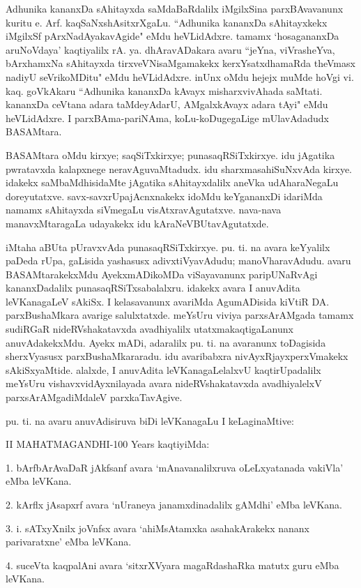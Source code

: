Adhunika kananxDa sAhitayxda saMdaBaRdalilx iMgilxSina parxBAvavanunx kuritu e. Arf. kaqSaNxshAsitxrXgaLu. ``Adhunika kananxDa sAhitayxkekx iMgilxSf pArxNadAyakavAgide" eMdu heVLidAdxre. tamamx `hosagananxDa aruNoVdaya' kaqtiyalilx rA. ya. dhAravADakara avaru ``jeYna, viVrasheYva, bArxhamxNa sAhitayxda tirxveVNisaMgamakekx kerxYsatxdhamaRda theVmasx nadiyU seVrikoMDitu" eMdu heVLidAdxre. inUnx oMdu hejejx muMde hoVgi vi. kaq. goVkAkaru ``Adhunika kananxDa kAvayx misharxvivAhada saMtati. kananxDa ceVtana adara taMdeyAdarU, AMgalxkAvayx adara tAyi" eMdu heVLidAdxre. I parxBAma-pariNAma, koLu-koDugegaLige mUlavAdadudx BASAMtara.  

BASAMtara oMdu kirxye; saqSiTxkirxye; punasaqRSiTxkirxye. idu jAgatika pwratavxda kalapxnege neravAguvaMtadudx. idu sharxmasahiSuNxvAda kirxye. idakekx saMbaMdhisidaMte jAgatika sAhitayxdalilx aneVka udAharaNegaLu doreyutatxve. savx-savxrUpajAcnxnakekx idoMdu keYgananxDi idariMda namamx sAhitayxda siVmegaLu visAtxravAgutatxve. nava-nava manavxMtaragaLa udayakekx idu kAraNeVBUtavAgutatxde.

iMtaha aBUta pUravxvAda punasaqRSiTxkirxye. pu. ti. na avara keYyalilx paDeda rUpa, gaLisida yashasusx adivxtiVyavAdudu; manoVharavAdudu. avaru BASAMtarakekxMdu AyekxmADikoMDa viSayavanunx paripUNaRvAgi kananxDadalilx punasaqRSiTxsabalalxru. idakekx avara I anuvAdita leVKanagaLeV sAkiSx. I kelasavanunx avariMda AgumADisida kiVtiR DA. parxBushaMkara avarige salulxtatxde. meYsUru viviya parxsArAMgada tamamx sudiRGaR nideRVshakatavxda avadhiyalilx utatxmakaqtigaLanunx anuvAdakekxMdu. Ayekx mADi, adaralilx pu. ti. na avaranunx toDagisida sherxVyasusx parxBushaMkararadu. idu avaribabxra nivAyxRjayxperxVmakekx sAkiSxyaMtide. alalxde, I anuvAdita leVKanagaLelalxvU kaqtirUpadalilx meYsUru vishavxvidAyxnilayada avara nideRVshakatavxda avadhiyalelxV parxsArAMgadiMdaleV parxkaTavAgive.

pu. ti. na avaru anuvAdisiruva biDi leVKanagaLu I keLaginaMtive:

{\rm II MAHATMAGANDHI-100 Years} kaqtiyiMda:

{\rm 1.} bArfbArAvaDaR jAkfsanf avara `mAnavanalilxruva oLeLxyatanada vakiVla' eMba leVKana.

{\rm 2.} kArflx jAsapxrf avara `nUraneya janamxdinadalilx gAMdhi' eMba leVKana.

{\rm 3.} i. sATxyXnilx joVnfsx avara `ahiMsAtamxka asahakArakekx nananx parivaratxne' eMba leVKana.

{\rm 4.} suceVta kaqpalAni avara `sitxrXVyara magaRdashaRka matutx guru eMba leVKana.

